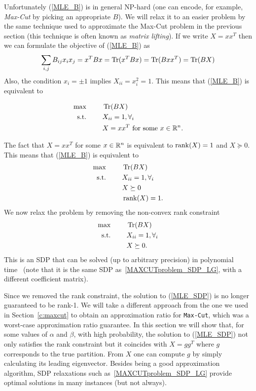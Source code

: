 Unfortunately (\ref{MLE_B}) is in general NP-hard (one can encode, for example, \emph{Max-Cut} by picking an appropriate $B$). We will relax it to an easier problem by the same technique used to approximate the  Max-Cut problem in the previous section (this technique is often known as \emph{matrix lifting}). If we write $X=xx^T$ then we can formulate the objective of (\ref{MLE_B}) as
\[
\sum_{i,j}B_{ij}x_ix_j = x^TBx = \operatorname{Tr}(x^TBx) = \operatorname{Tr}(Bxx^T) = \operatorname{Tr}(BX)
\]
Also, the condition $x_i = \pm1$ implies $X_{ii} = x_i^2 = 1$. This means that (\ref{MLE_B}) is equivalent to

\begin{align}
\max\ \qquad & \operatorname{Tr}(BX)\nonumber\\
\text{s.t.}\ \qquad &X_{ii}=1, \forall_i \label{eq:relaxation_SBM}\\
 & X=xx^T  \text{ for some } x\in\mathbb{R}^n.\nonumber
\end{align}

The fact that $X=xx^T$ for some $x\in\mathbb{R}^n$ is equivalent to $\operatorname{rank}(X) = 1$ and $X\succeq 0$. This means that (\ref{MLE_B}) is equivalent to
\begin{align}
\max\ \qquad& \operatorname{Tr}(BX)\nonumber\\
\text{s.t.}\ \qquad &X_{ii}=1, \forall_i \\
 & X \succeq 0 \nonumber\\
 & \operatorname{rank}(X) = 1.\nonumber
\end{align}
We now relax the problem by removing the non-convex rank constraint
\begin{align}
\max\ \qquad & \operatorname{Tr}(BX)\nonumber\\
\text{s.t.}\ \qquad & X_{ii}=1, \forall_i \label{MLE_SDP}\\
 & X \succeq 0 \nonumber.
 \end{align}
This is an SDP that can be solved (up to arbitrary precision) in polynomial time~\cite{LVanderberghe_SBoyd_1996} (note that it is the same SDP as~\eqref{MAXCUTproblem_SDP_LG}, with a different coefficient matrix).

Since we removed the rank constraint, the solution to (\ref{MLE_SDP}) is no longer guaranteed to be rank-1. We will take a different approach from the one we used in Section~\ref{c:maxcut} to obtain an approximation ratio for \texttt{Max-Cut}, which was a worst-case approximation ratio guarantee. In this section we will show that, for some values of $\alpha$ and $\beta$, with high probability, the solution to (\ref{MLE_SDP}) not only satisfies the rank constraint but it coincides with $X = gg^T$ where $g$ corresponds to the true partition. From $X$ one can compute $g$ by simply calculating its leading eigenvector. Besides being a good approximation algorithm, SDP relaxations such as~\eqref{MAXCUTproblem_SDP_LG} provide optimal solutions in many instances (but not always).





